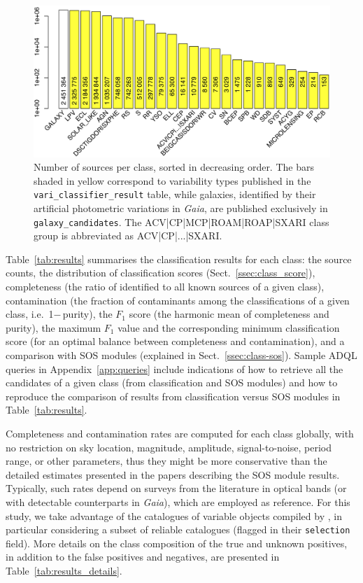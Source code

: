 \documentclass[longauth]{aa}
\def\gaia{\textit{Gaia}\xspace}
\begin{document}
\begin{figure}
\centering
 \includegraphics[width=\hsize]{figures/histo_all_classes.png}
 \caption{Number of sources per class, sorted in decreasing order. The bars shaded in yellow correspond to variability types published in the \texttt{vari\_classifier\_result} table, while galaxies, identified by their artificial photometric variations in \gaia, are published exclusively in \texttt{galaxy\_candidates}. The ACV|CP|MCP|ROAM|ROAP|SXARI class group is abbreviated as ACV|CP|...|SXARI.}
 \label{fig:histo}
\end{figure}

Table~\ref{tab:results} summarises the classification results for each class: the source counts, the distribution of classification scores (Sect.~\ref{ssec:class_score}), completeness (the ratio of identified to all known sources of a given class), contamination (the fraction of contaminants among the classifications of a given class, i.e.\ 1$-$\,purity), the $F_1$ score (the harmonic mean of completeness and purity), the maximum $F_1$ value and the corresponding  minimum classification score (for an optimal balance between completeness and contamination), and a comparison with SOS modules (explained in Sect.~\ref{ssec:class-sos}). 
Sample ADQL queries in Appendix~\ref{app:queries} include indications of how to retrieve all the candidates of a given class (from classification and SOS modules) and how to reproduce the comparison of results from classification versus SOS modules in Table~\ref{tab:results}. 

Completeness and contamination rates are computed for each class globally, with no restriction on sky location, magnitude, amplitude, signal-to-noise, period range, or other parameters, thus they might be more conservative than the detailed estimates presented in the papers describing the SOS module results. Typically, such rates depend on surveys from the literature in optical bands (or with detectable counterparts in \gaia), which are employed as reference. For this study, we take advantage of the catalogues of variable objects compiled by \citet{DR3-DPACP-177}, in particular considering a subset of reliable catalogues (flagged in their \texttt{selection} field). 
More details on the class composition of the true and unknown positives, in addition to the false positives and negatives, are presented in Table~\ref{tab:results_details}.
\end{document}
